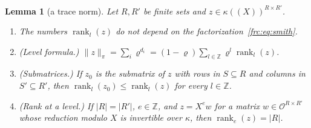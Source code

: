 \documentclass[11pt]{amsart}
\newtheorem{lemma}[theorem]{Lemma}
\theoremstyle{definition}
\theoremstyle{remark}
\numberwithin{equation}{section}
\newcommand{\Z}{\mathbb Z}
\newcommand{\abs}[1]{\lvert #1\rvert}
\newcommand{\norm}[1]{\lVert #1\rVert}
\newcommand{\rank}{\operatorname{rank}}
\theoremstyle{plain}
\theoremstyle{definition}
\theoremstyle{plain}
\begin{document}
\begin{lemma}[a trace norm]\label{frc:lem:trace-norm}
Let $R,R'$ be finite sets and $z\in\kappa((X))^{R\times R'}$.
\begin{enumerate}
\item The numbers $\rank_l(z)$ do not depend on the factorization~\eqref{frc:eq:smith}.
\item \textup{(Level formula.)} $\norm z_\pi=\sum_i\varrho^{d_i}=(1-\varrho)\sum_{l\in\Z}\varrho^l\rank_l(z)$.
\item \textup{(Submatrices.)} If $z_0$ is the submatrix of $z$ with rows in $S\subseteq R$ and columns in
$S'\subseteq R'$, then $\rank_l(z_0)\le\rank_l(z)$ for every $l\in\Z$.
\item \textup{(Rank at a level.)} If $\abs R=\abs{R'}$, $e\in\Z$, and $z=X^ew$ for a matrix $w\in\mathcal O^{R\times R'}$
whose reduction modulo $X$ is invertible over $\kappa$, then $\rank_e(z)=\abs R$.
\end{enumerate}
\end{lemma}
\end{document}
